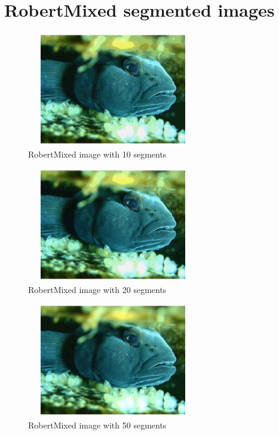 \documentclass[a4paper, 11pt]{article}
\begin{document}
\section{RobertMixed segmented images}
\begin{figure}[h!]
\centering
    \includegraphics[width=7.5cm, height=5cm]{images/Fish_10.jpeg}
    \caption{RobertMixed image with 10 segments}
\end{figure}
\begin{figure}[h!]
\centering
    \includegraphics[width=7.5cm, height=5cm]{images/Fish_20.jpeg}
    \caption{RobertMixed image with 20 segments}
\end{figure}
\begin{figure}[h!]
\centering
    \includegraphics[width=7.5cm, height=5cm]{images/Fish_50.jpeg}
    \caption{RobertMixed image with 50 segments}
\end{figure}
\clearpage
\end{document}
